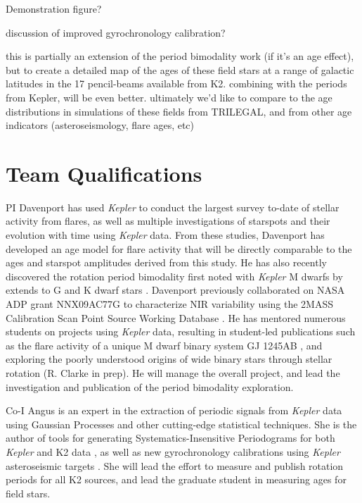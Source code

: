 \documentclass[12pt]{article}
\newcommand{\Kepler}{\textsl{Kepler}\xspace}
\begin{document}
Demonstration figure?

discussion of improved gyrochronology calibration?

this is partially an extension of the period bimodality work (if it's an age effect), but to create a detailed map of the ages of these field stars at a range of galactic latitudes in the 17 pencil-beams available from K2. combining with the periods from Kepler, will be even better. ultimately we'd like to compare to the age distributions in simulations of these fields from TRILEGAL, and from other age indicators (asteroseismology, flare ages, etc)



\section{Team Qualifications}
PI Davenport has used \Kepler to conduct the largest survey to-date of stellar activity from flares, as well as multiple investigations of starspots and their evolution with time using \Kepler data. From these studies, Davenport has developed an age model for flare activity that will be directly comparable to the ages and starspot amplitudes derived from this study. He has also recently discovered the rotation period bimodality first noted with \Kepler M dwarfs by \citet{mcquillan2013} extends to G and K dwarf stars \citep{davenport2017}.
Davenport previously collaborated on NASA ADP grant NNX09AC77G to characterize NIR variability using the 2MASS Calibration Scan Point Source Working Database \citep{davenport2012,davenport2015a}.
He has mentored numerous students on projects using \Kepler data, resulting in student-led publications such as the flare activity of a unique M dwarf binary system GJ 1245AB \citep{lurie2015}, and exploring the poorly understood origins of wide binary stars through stellar rotation (R. Clarke in prep). He will manage the overall project, and lead the investigation and publication of the period bimodality exploration.

Co-I Angus is an expert in the extraction of periodic signals from \Kepler data using Gaussian Processes \citep{angus2016c} and other cutting-edge statistical techniques. She is the author of tools for generating Systematics-Insensitive Periodograms for both \Kepler and K2 data \citep{angus2016}, as well as new gyrochronology calibrations using \Kepler asteroseismic targets \citep{angus2015}. She will lead the effort to measure and publish rotation periods for all K2 sources, and lead the graduate student in measuring ages for field stars.
\end{document}
